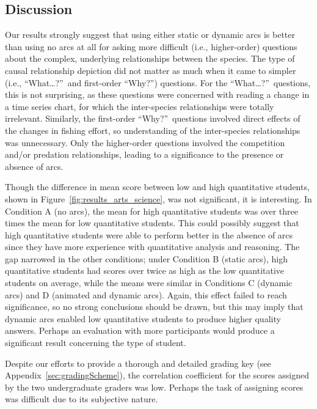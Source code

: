\subsection{Discussion}

Our results strongly suggest that using either static or dynamic arcs is better than using no arcs at all for asking more difficult (i.e., higher-order) questions about the complex, underlying relationships between the species.  The type of causal relationship depiction did not matter as much when it came to simpler (i.e., ``What\ldots?''\ and first-order ``Why?'') questions.  For the ``What\ldots?''\ questions, this is not surprising, as these questions were concerned with reading a change in a time series chart, for which the inter-species relationships were totally irrelevant.  Similarly, the first-order ``Why?''\ questions involved direct effects of the changes in fishing effort, so understanding of the inter-species relationships was unnecessary.  Only the higher-order questions involved the competition and/or predation relationships, leading to a significance to the presence or absence of arcs.

Though the difference in mean score between low and high quantitative students, shown in Figure~\ref{fig:results_arts_science}, was not significant, it is interesting.  In Condition A (no arcs), the mean for high quantitative students was over three times the mean for low quantitative students.  This could possibly suggest that high quantitative students were able to perform better in the absence of arcs since they have more experience with quantitative analysis and reasoning.  The gap narrowed in the other conditions; under Condition B (static arcs), high quantitative students had scores over twice as high as the low quantitative students on average, while the means were similar in Conditions C (dynamic arcs) and D (animated and dynamic arcs).  Again, this effect failed to reach significance, so no strong conclusions should be drawn, but this may imply that dynamic arcs enabled low quantitative students to produce higher quality answers.  Perhaps an evaluation with more participants would produce a significant result concerning the type of student.

Despite our efforts to provide a thorough and detailed grading key (see Appendix~\ref{sec:gradingScheme}), the correlation coefficient for the scores assigned by the two undergraduate graders was low.  Perhaps the task of assigning scores was difficult due to its subjective nature.  

